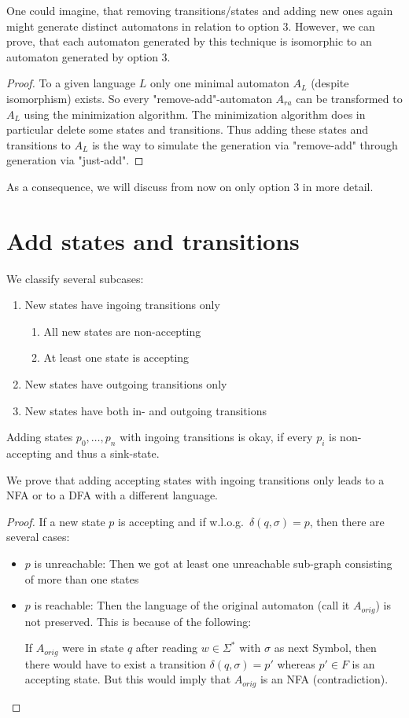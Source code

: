 \documentclass[a4paper, oneside, 11pt]{report}
\theoremstyle{definition}
\theoremstyle{remark}
\begin{document}
\noindent One could imagine, that removing transitions/states and adding new ones again might generate distinct automatons in relation to option 3. However, we can prove, that each automaton generated by this technique is isomorphic to an automaton generated by option 3.

\begin{proof}
	To a given language $L$ only one minimal automaton $A_L$ (despite isomorphism) exists.
	So every "remove-add"-automaton $A_{ra}$ can be transformed to $A_L$ using the minimization algorithm.
	The minimization algorithm does in particular delete some states and transitions.
	Thus adding these states and transitions to $A_L$ is the way to simulate the generation via "remove-add" through generation via "just-add".
\end{proof}
\noindent As a consequence, we will discuss from now on only option 3 in more detail.

\section{Add states and transitions}

We classify several subcases:

\begin{enumerate}
	\item New states have ingoing transitions only
	\begin{enumerate}
		\item All new states are non-accepting
		\item At least one state is accepting
	\end{enumerate}
	\item New states have outgoing transitions only
	\item New states have both in- and outgoing transitions
\end{enumerate}
Adding states $p_0, \ldots, p_n$ with ingoing transitions is okay, if every $p_i$ is non-accepting and thus a sink-state.

We prove that adding accepting states with ingoing transitions only leads to a NFA or to a DFA with a different language.
\begin{proof}
	If a new state $p$ is accepting and if w.l.o.g.\ $\delta(q, \sigma) = p$, then there are several cases:
	\begin{itemize}
		\item $p$ is unreachable: Then we got at least one unreachable sub-graph consisting of more than one states
		\item $p$ is reachable: Then the language of the original automaton (call it $A_{orig}$) is not preserved. This is because of the following:
		
		If $A_{orig}$ were in state $q$ after reading $w \in \Sigma^*$ with $\sigma$ as next Symbol, then there would have to exist a transition $\delta(q, \sigma) = p'$ whereas $p' \in F$ is an accepting state. But this would imply that $A_{orig}$ is an NFA (contradiction).
	\end{itemize}
\end{proof}
\end{document}

